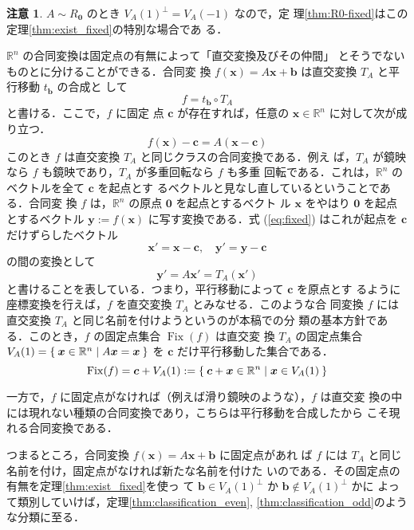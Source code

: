 \documentclass[11pt, uplatex, dvipdfmx, titlepage]{jsarticle}
\DeclareMathOperator{\Fix}{Fix}
\theoremstyle{definition}
\newtheorem*{remark}{注意}
\begin{document}
\begin{remark}
  $A \sim R_{\bm{0}}$ のとき $V_A(1)^{\perp}=V_A(-1)$ なので，定
  理\ref{thm:R0-fixed}はこの定理\ref{thm:exist_fixed}の特別な場合であ
  る．
\end{remark}


$\mathbb{R}^n$ の合同変換は固定点の有無によって「直交変換及びその仲間」
とそうでないものとに分けることができる．合同変
換 $f(\bm{x}) = A\bm{x} + \bm{b}$ は直交変換 $T_A$ と平行移動 $t_{\bm{b}}$ の合成と
して
\[
  f = t_{\bm{b}} \circ T_A
\]
と書ける．ここで，$f$ に固定
点 $\bm{c}$ が存在すれば，任意の $\bm{x} \in \mathbb{R}^n$ に対して次が成り立つ．
\begin{equation}\label{eq:fixed}
  f(\bm{x})-\bm{c}  = A(\bm{x} - \bm{c})  
\end{equation}
このとき $f$ は直交変換 $T_A$ と同じクラスの合同変換である．例え
ば，$T_A$ が鏡映なら $f$ も鏡映であり，$T_A$ が多重回転なら $f$ も多重
回転である．これは，$\mathbb{R}^n$ のベクトルを全て $\bm{c}$ を起点とす
るベクトルと見なし直しているということである．合同変
換 $f$ は，$\mathbb{R}^n$ の原点 $\bm{0}$ を起点とするベクト
ル $\bm{x}$ をやはり $\bm{0}$ を起点とするベクトル $\bm{y}:=
f(\bm{x})$ に写す変換である．式 (\ref{eq:fixed})
はこれが起点を $\bm{c}$ だけずらしたベクトル
\[
  \bm{x}'= \bm{x} - \bm{c}, \quad \bm{y}'=\bm{y}-\bm{c}
\]
の間の変換として
\[
  \bm{y}' = A\bm{x}' = T_A(\bm{x}')
\]
と書けることを表している．つまり，平行移動によって $\bm{c}$ を原点とす
るように座標変換を行えば，$f$ を直交変換 $T_A$ とみなせる．このような合
同変換 $f$ には直交変換 $T_A$ と同じ名前を付けようというのが本稿での分
類の基本方針である．このとき，$f$ の固定点集合 $\Fix(f)$ は直交変
換 $T_A$ の固定点集合
$V_A(1)=\Set{\bm{x} \in \mathbb{R}^n | A\bm{x} = \bm{x}}$ を $\bm{c}$
だけ平行移動した集合である．
\[
  \Fix(f) = \bm{c} + V_A(1) :=\Set{ \bm{c} + \bm{x}  \in \mathbb{R}^n | \bm{x} \in V_A(1)}
\]

一方で，$f$ に固定点がなければ（例えば滑り鏡映のような），$f$ は直交変
換の中には現れない種類の合同変換であり，こちらは平行移動を合成したから
こそ現れる合同変換である．

つまるところ，合同変換 $f(\bm{x}) = A\bm{x} + \bm{b}$ に固定点があれ
ば $f$ には $T_A$ と同じ名前を付け，固定点がなければ新たな名前を付けた
いのである．その固定点の有無を定理\ref{thm:exist_fixed}を使っ
て $\bm{b} \in V_A(1)^{\perp}$ か $\bm{b} \not\in V_A(1)^{\perp}$ かに
よって類別していけば，定理\ref{thm:classification_even},
\ref{thm:classification_odd}のような分類に至る．


\newpage
\end{document}
